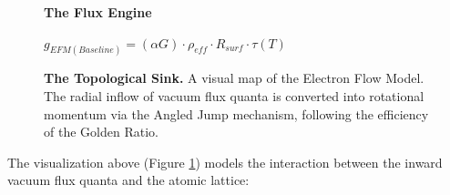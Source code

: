 \documentclass[11pt, a4paper]{article}
\begin{document}
\begin{figure}[!ht]
\centering
\vspace{1em} 
\textbf{The Flux Engine} \\ 
\vspace{0.5em}

\vspace{0.2em}
$g_{EFM(Baseline)} = (\alpha G) \cdot \rho_{eff} \cdot R_{surf} \cdot \tau(T)$

\caption{\textbf{The Topological Sink.} A visual map of the Electron Flow Model. The radial inflow of vacuum flux quanta is converted into rotational momentum via the Angled Jump mechanism, following the efficiency of the Golden Ratio.}
\label{fig:flux_sink}
\end{figure}

The visualization above (Figure \ref{fig:flux_sink}) models the interaction between the inward vacuum flux quanta and the atomic lattice:
\end{document}
